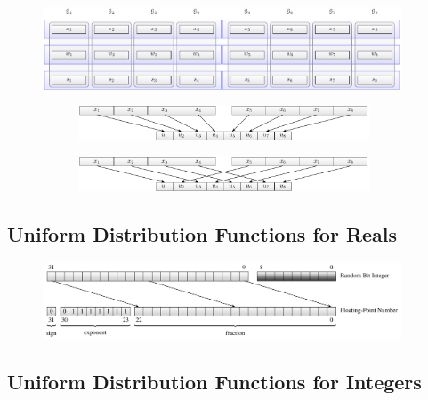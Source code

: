 \documentclass{stdlocal}
\begin{document}

    \begin{figure}
      \center
      \includegraphics[width=0.95\textwidth]{figures/msws_vector_layout.pdf}
      \caption[MSWS Vector Layout]{}
      \label{fig:msws-vector-layout}
    \end{figure}

    \begin{figure}
      \center
      \begin{subfigure}[b]{\textwidth}
        \center
        \includegraphics[width=0.95\textwidth]{figures/msws_merge.pdf}
      \end{subfigure}

      \begin{subfigure}[b]{\textwidth}
        \center
        \includegraphics[width=0.95\textwidth]{figures/msws_merge2.pdf}
      \end{subfigure}
      \caption[MSWS Vector Merge Scheme]{}
      \label{fig:msws-vector-merge-scheme}
    \end{figure}


  \subsection{Uniform Distribution Functions for Reals} %
  \label{sub:uniform_real_distribution}

    \begin{figure}
      \center
      \includegraphics[width=0.95\textwidth]{figures/uniform_implementation_scheme.pdf}
      \caption[Real Uniform Distribution Function Implementation Scheme]{}
      \label{fig:real-uniform-implementation-scheme}
    \end{figure}

  \subsection{Uniform Distribution Functions for Integers} %
  \label{sub:uniform_distribution_functions_for_integers}

\end{document}

